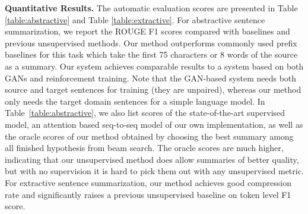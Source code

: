 \documentclass[11pt,a4paper]{article}
\begin{document}
\textbf{Quantitative Results.} 
The automatic evaluation scores are presented in Table \ref{table:abstractive} and Table \ref{table:extractive}. 
For abstractive sentence summarization,
we report the ROUGE F1 scores compared with baselines and previous unsupervised methods.
Our method outperforms commonly used prefix baselines for this task which take the first 75 characters or 8 words of the source as a summary. 
Our system achieves comparable results to \citet{wang2018learning} a system based on both GANs and reinforcement training.
Note that the GAN-based system needs both source and target sentences for training (they are unpaired), whereas our method only needs the target domain sentences for a simple language model.
In Table~\ref{table:abstractive}, we also list scores of the state-of-the-art supervised model, an attention based seq-to-seq model of our own implementation,
as well as the oracle scores of our method obtained by choosing the best summary among all finished hypothesis from beam search. The oracle scores are much higher, indicating that our unsupervised method does allow summaries of better quality, but with no supervision it is hard to pick them out with any unsupervised metric.
For extractive sentence summarization, our method achieves good compression rate and significantly raises a previous unsupervised baseline on token level F1 score. 
\end{document}

